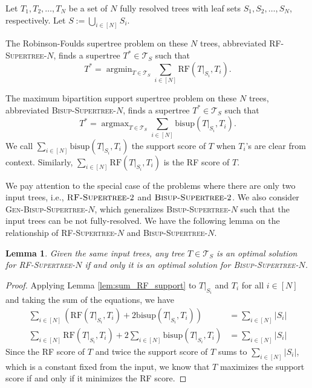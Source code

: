\documentclass{bmcart}
\newcommand{\bs}{\mathrm{bisup}}
\newcommand{\RF}{\mathrm{RF}}
\newcommand{\bisuptwo}{\textsc{Bisup-Supertree-$2$}\xspace}
\newcommand{\bisupn}{\textsc{Bisup-Supertree-$N$}\xspace}
\newcommand{\genbisup}{\textsc{Gen-Bisup-Supertree-$N$}\xspace}
\newcommand{\rfn}{\textsc{RF-Supertree-$N$}\xspace}
\newcommand{\rftwo}{\textsc{RF-Supertree-$2$}\xspace}
\DeclareMathOperator*{\argmin}{argmin}
\DeclareMathOperator*{\argmax}{argmax}
\newtheorem{lemma}{Lemma}
\begin{document}


Let $T_1,T_2,\dots,T_N$ be a set of $N$ fully resolved trees with leaf sets $S_1,S_2,\dots,S_N$, respectively. Let $S := \bigcup_{i \in [N]}S_i$.

The Robinson-Foulds supertree problem on these $N$ trees, abbreviated \rfn, finds a supertree $T^* \in \mathcal{T}_S$ such that
\[T^* = \argmin_{T \in \mathcal{T}_S} \sum_{i \in [N]} \RF(T|_{S_i}, T_i).\]

The maximum bipartition support supertree problem on these $N$ trees, abbreviated \bisupn, finds a supertree $T^* \in \mathcal{T}_S$ such that
\[T^* = \argmax_{T \in \mathcal{T}_S} \sum_{i \in [N]} \bs(T|_{S_i}, T_i).\]
We call $\sum_{i\in[N]}\bs(T|_{S_i}, T_i)$ the support score of $T$ when $T_i$'s are clear from context. Similarly, $\sum_{i \in [N]} \RF(T|_{S_i}, T_i)$ is the RF score of $T$.

We pay attention to the special case of the problems where there are only two input trees, i.e., $\rftwo$ and $\bisuptwo$. We also consider \genbisup, which generalizes \bisupn such that the input trees can be not fully-resolved. We have the following lemma on the relationship of \rfn and \bisupn.

\begin{lemma}
Given the same input trees, any tree $T \in \mathcal{T}_S$ is an optimal solution for \rfn if and only it is an optimal solution for \bisupn.
\end{lemma}
\begin{proof}
  Applying Lemma \ref{lem:sum_RF_support} to $T|_{S_i}$ and $T_i$ for all $i \in [N]$ and taking the sum of the equations, we have
  \begin{align*}
    \sum_{i \in [N]} (\RF(T|_{S_i}, T_i) + 2\bs(T|_{S_i},T_i)) &= \sum_{i \in [N]} |S_i| \\
    \sum_{i \in [N]} \RF(T|_{S_i}, T_i) + 2\sum_{i \in [N]}\bs(T|_{S_i},T_i) &= \sum_{i \in [N]} |S_i|
  \end{align*}
  Since the RF score of $T$ and twice the support score of $T$ sums to $\sum_{i \in [N]} |S_i|$, which is a constant fixed from the input, we know that $T$ maximizes the support score if and only if it minimizes the RF score.
\end{proof}
\end{document}
